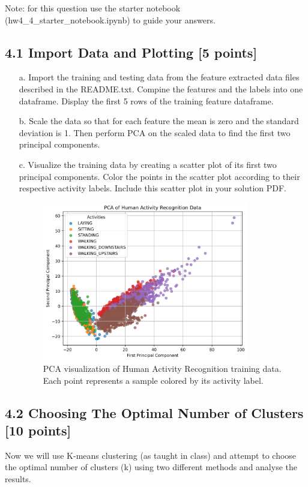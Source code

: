\documentclass[a3paper,12pt]{extarticle} %
\begin{document}
\begin{enumerate}
Note: for this question use the starter notebook (hw4\_4\_starter\_notebook.ipynb) to guide your answers.

\subsection*{4.1 Import Data and Plotting [5 points]}
\begin{itemize}
\item[a.] Import the training and testing data from the feature extracted data files described in the README.txt. Compine the features and the labels into one dataframe. Display the first 5 rows of the training feature dataframe.
\item[b.] Scale the data so that for each feature the mean is zero and the standard deviation is 1. Then perform PCA on the scaled data to find the first two principal components.
\item[c.] Visualize the training data by creating a scatter plot of its first two principal components. Color the points in the scatter plot according to their respective activity labels. Include this scatter plot in your solution PDF.
\begin{figure}[htbp]
    \centering
    \includegraphics[width=0.85\textwidth]{PCA_activities.png}
    \caption{PCA visualization of Human Activity Recognition training data. Each point represents a sample colored by its activity label.}
    \label{fig:pca-har}
\end{figure}

\end{itemize}

\subsection*{4.2 Choosing The Optimal Number of Clusters [10 points]}
Now we will use K-means clustering (as taught in class) and attempt to choose the optimal number of clusters (k) using two different methods and analyse the results.


\end{enumerate}
\end{document}
